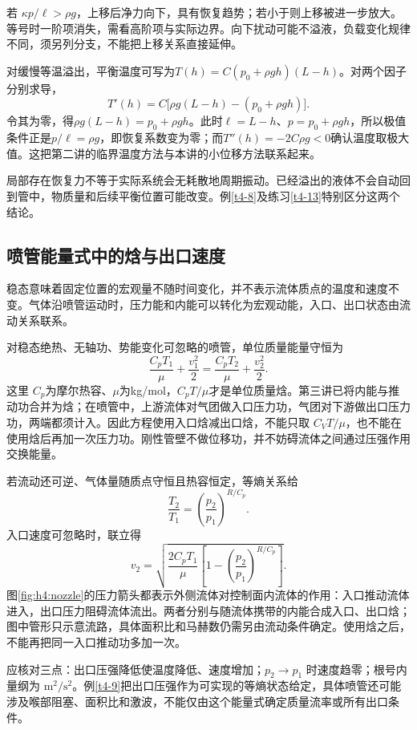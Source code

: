 若 $\kappa p/\ell>\rho g$，上移后净力向下，具有恢复趋势；若小于则上移被进一步放大。等号时一阶项消失，需看高阶项与实际边界。向下扰动可能不溢液，负载变化规律不同，须另列分支，不能把上移关系直接延伸。

对缓慢等温溢出，平衡温度可写为$T(h)=C(p_0+\rho gh)(L-h)$。对两个因子分别求导，
\[
T'(h)=C\bigl[\rho g(L-h)-(p_0+\rho gh)\bigr].
\]
令其为零，得$\rho g(L-h)=p_0+\rho gh$。此时$\ell=L-h$、$p=p_0+\rho gh$，所以极值条件正是$p/\ell=\rho g$，即恢复系数变为零；而$T''(h)=-2C\rho g<0$确认温度取极大值。这把第二讲的临界温度方法与本讲的小位移方法联系起来。

局部存在恢复力不等于实际系统会无耗散地周期振动。已经溢出的液体不会自动回到管中，物质量和后续平衡位置可能改变。例\ref{t4-8}及练习\ref{t4-13}特别区分这两个结论。

\subsection{喷管能量式中的焓与出口速度}
稳态意味着固定位置的宏观量不随时间变化，并不表示流体质点的温度和速度不变。气体沿喷管运动时，压力能和内能可以转化为宏观动能，入口、出口状态由流动关系联系。

对稳态绝热、无轴功、势能变化可忽略的喷管，单位质量能量守恒为
\[\frac{C_pT_1}{\mu}+\frac{v_1^2}{2}=\frac{C_pT_2}{\mu}+\frac{v_2^2}{2}.
\]
这里 $C_p$为摩尔热容、$\mu$为kg/mol，$C_pT/\mu$才是单位质量焓。第三讲已将内能与推动功合并为焓；在喷管中，上游流体对气团做入口压力功，气团对下游做出口压力功，两端都须计入。因此方程使用入口焓减出口焓，不能只取 $C_VT/\mu$，也不能在使用焓后再加一次压力功。刚性管壁不做位移功，并不妨碍流体之间通过压强作用交换能量。

若流动还可逆、气体量随质点守恒且热容恒定，等熵关系给
\[\frac{T_2}{T_1}=\left(\frac{p_2}{p_1}\right)^{R/C_p}.
\]
入口速度可忽略时，联立得
\[\boxed{v_2=\sqrt{\frac{2C_pT_1}{\mu}\left[1-\left(\frac{p_2}{p_1}\right)^{R/C_p}\right]}}.
\]
图\ref{fig:h4:nozzle}的压力箭头都表示外侧流体对控制面内流体的作用：入口推动流体进入，出口压力阻碍流体流出。两者分别与随流体携带的内能合成入口、出口焓；图中管形只示意流路，具体面积比和马赫数仍需另由流动条件确定。使用焓之后，不能再把同一入口推动功多加一次。



应核对三点：出口压强降低使温度降低、速度增加；$p_2\to p_1$ 时速度趋零；根号内量纲为 $\mathrm{m^2/s^2}$。例\ref{t4-9}把出口压强作为可实现的等熵状态给定，具体喷管还可能涉及喉部阻塞、面积比和激波，不能仅由这个能量式确定质量流率或所有出口条件。

